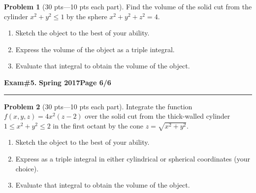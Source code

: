 \documentclass[12pt]{article}
\theoremstyle{definition}
\newtheorem{problem}{Problem}
\begin{document}
\bigskip
\begin{problem}[30 pts---10 pts each part]
Find the volume of the solid cut from the cylinder $x^2+y^2 \leq 1$ by the sphere $x^2+y^2+z^2=4$.
\begin{enumerate}
\item Sketch the object to the best of your ability.
\vspace{5cm}
\item Express the volume of the object as a triple integral.
\vspace{5cm}
\begin{flushright}
\end{flushright}
\item Evaluate that integral to obtain the volume of the object.
\vspace{5cm}
\begin{flushright}
\end{flushright}
\end{enumerate}
\end{problem}

\hfill{\large\bf Exam\#5.}\hfill{\large\bf
  Spring 2017}\hfill{\large\bf Page 6/6}\hrule

\bigskip
\begin{problem}[30 pts---10 pts each part]
Integrate the function $f(x,y,z) = 4x^2(z-2)$ over the solid cut from the thick-walled cylinder $1\leq x^2+y^2 \leq 2$ in the first octant by the cone $z = \sqrt{x^2+y^2}$.
\begin{enumerate}
\item Sketch the object to the best of your ability.
\vspace{5cm}
\item Express as a triple integral in either cylindrical or spherical coordinates (your choice).
\vspace{5cm}
\begin{flushright}
\end{flushright}
\item Evaluate that integral to obtain the volume of the object.
\vspace{5cm}
\begin{flushright}
\end{flushright}
\end{enumerate}
\end{problem}
\end{document}
